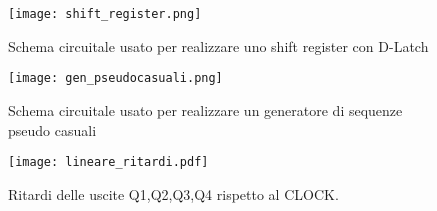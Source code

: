 \begin{figure}[h]
	\centering
	\texttt{[image: shift\_register.png]}
	\caption{Schema circuitale usato per realizzare uno shift register con D-Latch}
	\label{f:shift_register}
\end{figure}


\begin{figure}[h]
	\centering
	\texttt{[image: gen\_pseudocasuali.png]}
	\caption{Schema circuitale usato per realizzare un generatore di sequenze pseudo casuali}
	\label{f:gen_pseudocasuali}
\end{figure}

\begin{figure}[h]
	\centering
	\texttt{[image: lineare\_ritardi.pdf]}
	\caption{Ritardi delle uscite Q1,Q2,Q3,Q4 rispetto al CLOCK.}
	\label{f:ritardo}
\end{figure}